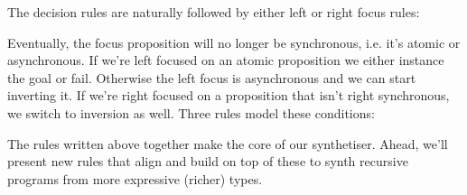 \documentclass{llncs}
\newcommand{\lolli}{\multimap}
\newcommand{\tensor}{\otimes}
\newcommand{\bang}{{!}}
\begin{document}
The decision rules are naturally followed by either left or right focus rules:
Eventually, the focus proposition will no longer be synchronous, i.e. it's atomic or
asynchronous. If we're left focused on an atomic proposition we either instance
the goal or fail. Otherwise the left focus is asynchronous and we can start
inverting it. If we're right focused on a proposition that isn't right
synchronous, we switch to inversion as well. Three rules model these conditions:
The rules written above together make the core of our synthetiser. Ahead, we'll
present new rules that align and build on top of these to synth recursive
programs from more expressive (richer) types.
\end{document}
